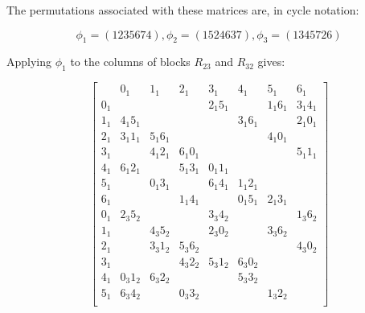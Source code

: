 \begin{example}
The permutations associated with these matrices are, in cycle notation:

\begin{equation*}
  \phi _1 = (1235674), \phi _2 = (1524637), \phi _3 = (1345726)
\end{equation*}
\end{example}

\begin{example}
Applying $\phi _1$ to the columns of blocks $R_{23}$ and $R_{32}$ gives:

\begin{equation*}
  \begin{bmatrix}
         &      0_{1} &   1_{1}    &    2_{1}    &    3_{1}   &    4_{1}    &    5_{1}   &    6_{1}   \\
   0_{1} &            &            &             & 2_{1}5_{1} &             & 1_{1}6_{1} & 3_{1}4_{1} \\
   1_{1} & 4_{1}5_{1} &            &             &            & 3_{1}6_{1}  &            & 2_{1}0_{1} \\
   2_{1} & 3_{1}1_{1} & 5_{1}6_{1} &             &            &             & 4_{1}0_{1} &            \\
   3_{1} &            & 4_{1}2_{1} &  6_{1}0_{1} &            &             &            & 5_{1}1_{1} \\ 
   4_{1} & 6_{1}2_{1} &            &  5_{1}3_{1} & 0_{1}1_{1} &             &            &            \\
   5_{1} &            & 0_{1}3_{1} &             & 6_{1}4_{1} & 1_{1}2_{1}  &            &            \\
   6_{1} &            &            &  1_{1}4_{1} &            & 0_{1}5_{1}  & 2_{1}3_{1} &            \\
   0_{1} & 2_{3}5_{2} &            &             & 3_{3}4_{2} &             &            & 1_{3}6_{2} \\
   1_{1} &            & 4_{3}5_{2} &             & 2_{3}0_{2} &             & 3_{3}6_{2} &            \\
   2_{1} &            & 3_{3}1_{2} &  5_{3}6_{2} &            &             &            & 4_{3}0_{2} \\
   3_{1} &            &            &  4_{3}2_{2} & 5_{3}1_{2} & 6_{3}0_{2}  &            &            \\
   4_{1} & 0_{3}1_{2} & 6_{3}2_{2} &             &            & 5_{3}3_{2}  &            &            \\
   5_{1} & 6_{3}4_{2} &            &  0_{3}3_{2} &            &             & 1_{3}2_{2} &            \\

\end{bmatrix}
\end{equation*}
\end{example}
